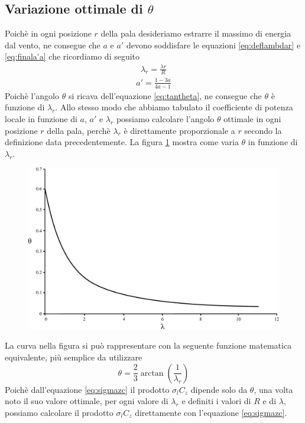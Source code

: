 \subsection{Variazione ottimale di $\theta$}
Poichè in ogni posizione $r$ della pala desideriamo estrarre il massimo di energia dal vento, ne consegue che $a$ e $a'$ devono soddisfare le equazioni \ref{eq:deflambdar}  e \ref{eq:finala'a} che ricordiamo di seguito
\begin{align*}
\lambda_r = \frac{\lambda r}{R}
\end{align*}
\begin{align*}
a' = \frac{1-3a}{4a-1}
\end{align*}
Poichè l'angolo $\theta$ si ricava dell'equazione \ref{eq:tantheta}, ne consegue che $\theta$ è funzione di $\lambda_r$. Allo stesso modo che abbiamo tabulato il coefficiente di potenza locale in funzione di $a$, $a'$ e $\lambda_r$ possiamo calcolare l'angolo $\theta$ ottimale in ogni posizione $r$ della pala, perchè $\lambda_r$ è direttamente proporzionale a $r$ secondo la definizione data precedentemente. La figura \ref{fig:lambdatheta} mostra come varia $\theta$ in funzione di $\lambda_r$.
\begin{figure}[h!]
\centering
  \includegraphics[width=.7\textwidth]{fig/lambdatheta.pdf}
\caption{}
\label{fig:lambdatheta}
\end{figure}
La curva nella figura si può rappresentare con la seguente funzione matematica equivalente, più semplice da utilizzare
\begin{equation}
\theta = \frac{2}{3} \arctan \left( \frac{1}{\lambda_r} \right)
\end{equation}
Poichè dall'equazione \ref{eq:sigmazc} il prodotto $\sigma_l C_z$ dipende solo da $\theta$, una volta noto il suo valore ottimale, per ogni valore di $\lambda_r$ e definiti i valori di $R$ e di $\lambda$, possiamo calcolare il prodotto $\sigma_l C_z$ direttamente con l'equazione \ref{eq:sigmazc}.

